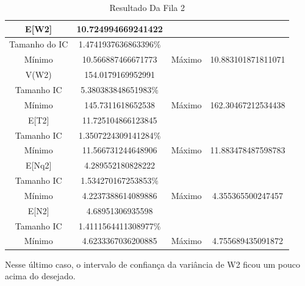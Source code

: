 \documentclass[a4paper,10pt]{article}
\begin{document}
	    \begin{table}[H] 
		  \centering
		  \begin{tabular}{|c|c|c|c|}
		        \hline
			 E[W2]         & 10.724994669241422      &        &                        \\ \hline
			 Tamanho do IC & 1.4741937636863396$\%$  & 	  &		         \\ \hline
			 Mínimo        & 10.566887466671773      & Máximo & 10.883101871811071     \\ \hline
			 V(W2)         & 154.0179169952991       &	  &		         \\ \hline	
			 Tamanho IC    & 5.380383848651983$\%$   &	  &		         \\ \hline
			 Mínimo        & 145.7311618652538       & Máximo & 162.30467212534438	 \\ \hline
			 E[T2]         & 11.725104866123845      &	  &		         \\ \hline	
			 Tamanho IC    & 1.3507224309141284$\%$  &	  &		         \\ \hline
			 Mínimo        & 11.566731244648906      & Máximo & 11.883478487598783	 \\ \hline
			 E[Nq2]        & 4.289552180828222       &	  &		         \\ \hline	
			 Tamanho IC    & 1.534270167253853$\%$   &	  &		         \\ \hline
			 Mínimo        & 4.2237388614089886      & Máximo & 4.355365500247457	 \\ \hline
			 E[N2]         & 4.68951306935598        &	  &		         \\ \hline	
			 Tamanho IC    & 1.4111564411308977$\%$  &	  &		         \\ \hline
			 Mínimo        & 4.6233367036200885      & Máximo & 4.755689435091872	 \\ \hline
		  \end{tabular}
		  \caption{Resultado Da Fila 2} 
	    \end{table}
      Nesse último caso, o intervalo de confiança da variância de W2 ficou um pouco acima do desejado.
\end{document}
